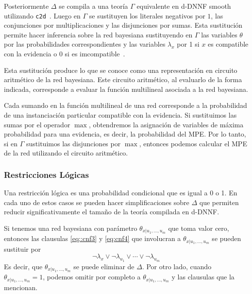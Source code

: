\documentclass[11pt, letterpaper]{article}
\begin{document}
Posteriormente $\Delta$ se compila a una teoría $\Gamma$
equivalente en d-DNNF smooth utilizando
\texttt{c2d}~{\cite{darwicheAAAI02}}. Luego en $\Gamma$ se sustituyen
los literales negativos por $1$, las conjunciones por
multiplicaciones y las disjunciones por sumas. Esta sustitución
permite hacer inferencia sobre la red bayesiana sustituyendo en
$\Gamma$ las variables $\theta$ por las probabilidades
correspondientes y las variables $\lambda_x$ por 1 si $x$ es
compatible con la evidencia o 0 si es imcompatible~\cite{Darwiche01alogical}.

Esta sustitución produce lo que se conoce como una representación en
circuito aritmético de la red bayesiana. Este circuito aritmético, al
evaluarlo de la forma indicada, corresponde a evaluar la función
multilineal asociada a la red bayesiana.


Cada sumando en la función multilineal de una red corresponde a la
probabilidad de una instanciación particular compatible con la
evidencia. Si sustituimos las sumas por el operador $\max$,
obtendremos la asignación de variables de máxima probabilidad para una evidencia,
es decir, la probabilidad del MPE. Por lo tanto, si en $\Gamma$
sustituimos las disjunciones por $\max$, entonces podemos calcular el
MPE de la red utilizando el circuito aritmético.

\subsubsection{Restricciones Lógicas}
Una restricción lógica es una probabilidad condicional que es igual a
0 o 1. En cada uno de estos casos se pueden hacer simplificaciones
sobre $\Delta$ que permiten reducir significativamente el tamaño de la
teoría compilada en d-DNNF.

Si tenemos una red bayesiana con parámetro $\theta_{x|u_1,\dots,u_m}$
que toma valor cero, entonces las clausulas \eqref{eq::cnf3} y
\eqref{eq:cnf4} que involucran a $\theta_{x|u_1,\dots,u_m}$ se pueden sustituir por
\begin{equation}
  \label{eq:simpcero}
  \neg \lambda_{x} \lor \neg \lambda_{u_1} \lor \cdots \lor \neg \lambda_{u_m}
\end{equation}
Es decir, que $\theta_{x|u_1,\dots,u_m}$ se puede eliminar de
$\Delta$. Por otro lado, cuando $\theta_{x|u_1,\dots,u_m}=1$, podemos
omitir por completo a $\theta_{x|u_1,\dots,u_m}$ y las clausulas que
la mencionan.
\end{document}
